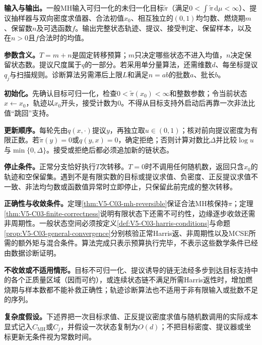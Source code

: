 \label{struct:V5-C03-CH20}
\textbf{输入与输出。}一般MH输入可归一化的未归一化目标$\widetilde\pi$（满足$0<\int\widetilde\pi\,\mathrm d\mu<\infty$）、提议抽样器与双向密度求值器、合法初值$x_0$、相互独立的$(0,1)$均匀数、燃烧期$m$、保留数$n$及可选函数$f$。输出完整状态轨迹、提议、接受判定、保留样本，以及在$n>0$且$f$合法时的均值。

\label{struct:V5-C03-CH21}
\textbf{参数含义。}$T=m+n$是固定转移预算；$m$只决定哪些状态不进入均值，$n$决定保留状态数。提议尺度属于$q$的一部分。若采用单分量算法，还需维数$d$、每坐标提议$q_j$与扫描规则。诊断算法另需滞后上限$L$和满足$n=ab$的批数$a$、批长$b$。

\label{struct:V5-C03-CH22}
\textbf{初始化。}先确认目标可归一化，检查$0<\widetilde\pi(x_0)<\infty$和整数参数；令当前状态$x\leftarrow x_0$，轨迹以$x_0$开头，接受计数为$0$。不得从目标支持外启动后再靠一次非法比值“跳回”支持。

\label{struct:V5-C03-CH23}
\textbf{更新顺序。}每轮先由$q(x,\cdot)$提议$y$，再独立取$u\in(0,1)$；核对前向提议密度为有限正数。若$\widetilde\pi(y)=0$或$q(y,x)=0$，确定拒绝；否则计算对数比$\Delta$并比较$\log u$与$\min\{0,\Delta\}$。接受或拒绝后都必须追加新的链状态。

\label{struct:V5-C03-CH24}
\textbf{停止条件。}正常分支恰好执行$T$次转移。$T=0$时不调用任何随机数，返回只含$x_0$的轨迹和空保留集。遇到不是有限实数的目标或提议求值、负密度、正反提议求值不一致、非法均匀数或函数值异常时立即停止，只保留此前完成的整次转移。

\label{struct:V5-C03-CH25}
\textbf{正确性与收敛条件。}定理\ref{thm:V5-C03-mh-reversible}保证合法MH核保持$\pi$；定理\ref{thm:V5-C03-finite-correctness}说明有限状态下还需不可约性，边缘逐步收敛还需非周期性。一般状态空间必须按定义\ref{def:V5-C03-harris-conditions}与命题\ref{prop:V5-C03-general-convergence}分别核验正常Harris返、非周期性以及MCSE所需的额外矩与混合条件。算法完成只表示预算执行完毕，不表示这些数学条件已经由数据诊断证明。

\textbf{不收敛或不适用情形。}目标不可归一化、提议诱导的链无法经多步到达目标支持中的各个正质量区域（因而可约），或连续状态链不满足所需Harris返性时，增加燃烧期与样本数都不能补救正确性；轨迹诊断算法也不适用于非有限输入或批数不足的序列。

\textbf{复杂度假设。}下述界把一次目标求值、正反提议密度求值与随机数调用的实际成本显式记入$C_{\mathrm{MH}}$或$C_j$，并假设一次状态复制为$O(d)$；不把目标密度、提议器或坐标更新无条件视为常数时间。

\begingroup
{}

